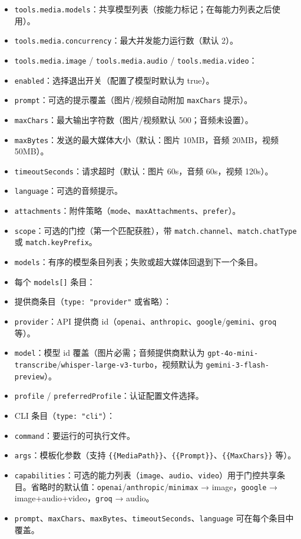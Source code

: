 \begin{itemize}
  \item \texttt{tools.media.models}：共享模型列表（按能力标记；在每能力列表之后使用）。
  \item \texttt{tools.media.concurrency}：最大并发能力运行数（默认 2）。
  \item \texttt{tools.media.image} / \texttt{tools.media.audio} / \texttt{tools.media.video}：
  \item \texttt{enabled}：选择退出开关（配置了模型时默认为 true）。
  \item \texttt{prompt}：可选的提示覆盖（图片/视频自动附加 \texttt{maxChars} 提示）。
  \item \texttt{maxChars}：最大输出字符数（图片/视频默认 500；音频未设置）。
  \item \texttt{maxBytes}：发送的最大媒体大小（默认：图片 10MB，音频 20MB，视频 50MB）。
  \item \texttt{timeoutSeconds}：请求超时（默认：图片 60s，音频 60s，视频 120s）。
  \item \texttt{language}：可选的音频提示。
  \item \texttt{attachments}：附件策略（\texttt{mode}、\texttt{maxAttachments}、\texttt{prefer}）。
  \item \texttt{scope}：可选的门控（第一个匹配获胜），带 \texttt{match.channel}、\texttt{match.chatType} 或 \texttt{match.keyPrefix}。
  \item \texttt{models}：有序的模型条目列表；失败或超大媒体回退到下一个条目。
  \item 每个 \texttt{models[]} 条目：
  \item 提供商条目（\texttt{type: "provider"} 或省略）：
  \item \texttt{provider}：API 提供商 id（\texttt{openai}、\texttt{anthropic}、\texttt{google}/\texttt{gemini}、\texttt{groq} 等）。
  \item \texttt{model}：模型 id 覆盖（图片必需；音频提供商默认为 \texttt{gpt-4o-mini-transcribe}/\texttt{whisper-large-v3-turbo}，视频默认为 \texttt{gemini-3-flash-preview}）。
  \item \texttt{profile} / \texttt{preferredProfile}：认证配置文件选择。
  \item CLI 条目（\texttt{type: "cli"}）：
  \item \texttt{command}：要运行的可执行文件。
  \item \texttt{args}：模板化参数（支持 \texttt{\{\{MediaPath\}\}}、\texttt{\{\{Prompt\}\}}、\texttt{\{\{MaxChars\}\}} 等）。
  \item \texttt{capabilities}：可选的能力列表（\texttt{image}、\texttt{audio}、\texttt{video}）用于门控共享条目。省略时的默认值：\texttt{openai}/\texttt{anthropic}/\texttt{minimax} → image，\texttt{google} → image+audio+video，\texttt{groq} → audio。
  \item \texttt{prompt}、\texttt{maxChars}、\texttt{maxBytes}、\texttt{timeoutSeconds}、\texttt{language} 可在每个条目中覆盖。
\end{itemize}


